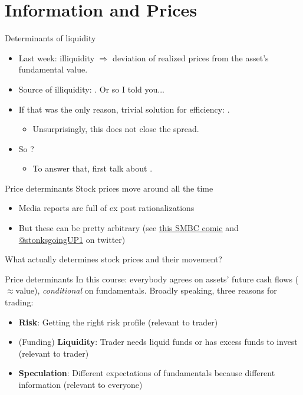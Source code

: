 \documentclass[english,10pt
,aspectratio=169
]{beamer}
\begin{document}
\section{Information and Prices}

\begin{frame}{Determinants of liquidity}
	\begin{itemize}[<+->]
		\item Last week: \alert{illiquidity} $\Rightarrow$ deviation of realized prices from the asset's fundamental value.
		\item Source of illiquidity: . Or so I told you...
		\item If that was the only reason, trivial solution for efficiency: \visible<handout:0>{add many dealers}.
		\begin{itemize}
			\item Unsurprisingly, this does not close the spread.
		\end{itemize}
		\item So ?
		\begin{itemize}
			\item To answer that, first talk about .
		\end{itemize}
	\end{itemize}
\end{frame}


\begin{frame}{Price determinants}
	Stock prices move around all the time
	\begin{itemize}
		\item Media reports are full of ex post rationalizations 
		\item But these can be pretty arbitrary (see \href{https://www.smbc-comics.com/comic/markets}{\uline{this SMBC comic}} and \href{https://twitter.com/stonksgoingUP1}{@stonksgoingUP1} on twitter)
	\end{itemize}
	What actually determines stock prices and their movement?
\end{frame}


\begin{frame}{Price determinants}
	In this course: everybody agrees on assets' future cash flows ($\approx$value), \textit{conditional} on fundamentals. Broadly speaking, three reasons for trading:
	\begin{itemize}
		\item \textbf{Risk}: Getting the right risk profile (relevant to trader)
		\item (Funding) \textbf{Liquidity}: Trader needs liquid funds or has excess funds to invest (relevant to trader)
		\item \textbf{Speculation}: Different expectations of fundamentals because different \alert{information} (relevant to everyone)
	\end{itemize}
\end{frame}
\end{document}
